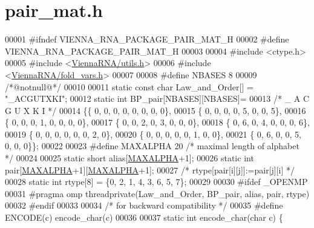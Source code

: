 \hypertarget{pair__mat_8h_source}{}\section{pair\+\_\+mat.\+h}
\label{pair__mat_8h_source}

\begin{DoxyCode}
00001 \textcolor{preprocessor}{#ifndef VIENNA\_RNA\_PACKAGE\_PAIR\_MAT\_H}
00002 \textcolor{preprocessor}{#define VIENNA\_RNA\_PACKAGE\_PAIR\_MAT\_H}
00003 
00004 \textcolor{preprocessor}{#include <ctype.h>}
00005 \textcolor{preprocessor}{#include <\hyperlink{utils_8h}{ViennaRNA/utils.h}>}
00006 \textcolor{preprocessor}{#include <\hyperlink{fold__vars_8h}{ViennaRNA/fold\_vars.h}>}
00007 
00008 \textcolor{preprocessor}{#define NBASES 8}
00009 \textcolor{comment}{/*@notnull@*/}
00010 
00011 \textcolor{keyword}{static} \textcolor{keyword}{const} \textcolor{keywordtype}{char} Law\_and\_Order[] = \textcolor{stringliteral}{"\_ACGUTXKI"};
00012 \textcolor{keyword}{static} \textcolor{keywordtype}{int} BP\_pair[NBASES][NBASES]=
00013 \textcolor{comment}{/* \_  A  C  G  U  X  K  I */}
00014 \{\{ 0, 0, 0, 0, 0, 0, 0, 0\},
00015  \{ 0, 0, 0, 0, 5, 0, 0, 5\},
00016  \{ 0, 0, 0, 1, 0, 0, 0, 0\},
00017  \{ 0, 0, 2, 0, 3, 0, 0, 0\},
00018  \{ 0, 6, 0, 4, 0, 0, 0, 6\},
00019  \{ 0, 0, 0, 0, 0, 0, 2, 0\},
00020  \{ 0, 0, 0, 0, 0, 1, 0, 0\},
00021  \{ 0, 6, 0, 0, 5, 0, 0, 0\}\};
00022 
00023 \textcolor{preprocessor}{#define MAXALPHA 20       }\textcolor{comment}{/* maximal length of alphabet */}\textcolor{preprocessor}{}
00024 
00025 \textcolor{keyword}{static} \textcolor{keywordtype}{short} alias[\hyperlink{group__model__details_ga05a5ffe718aa431d97419a12fb082379}{MAXALPHA}+1];
00026 \textcolor{keyword}{static} \textcolor{keywordtype}{int} pair[\hyperlink{group__model__details_ga05a5ffe718aa431d97419a12fb082379}{MAXALPHA}+1][\hyperlink{group__model__details_ga05a5ffe718aa431d97419a12fb082379}{MAXALPHA}+1];
00027 \textcolor{comment}{/* rtype[pair[i][j]]:=pair[j][i] */}
00028 \textcolor{keyword}{static} \textcolor{keywordtype}{int} rtype[8] = \{0, 2, 1, 4, 3, 6, 5, 7\};
00029 
00030 \textcolor{preprocessor}{#ifdef \_OPENMP}
00031 \textcolor{preprocessor}{#pragma omp threadprivate(Law\_and\_Order, BP\_pair, alias, pair, rtype)}
00032 \textcolor{preprocessor}{#endif}
00033 
00034 \textcolor{comment}{/* for backward compatibility */}
00035 \textcolor{preprocessor}{#define ENCODE(c) encode\_char(c)}
00036 
00037 \textcolor{keyword}{static} \textcolor{keywordtype}{int} encode\_char(\textcolor{keywordtype}{char} c) \{

\end{DoxyCode}
